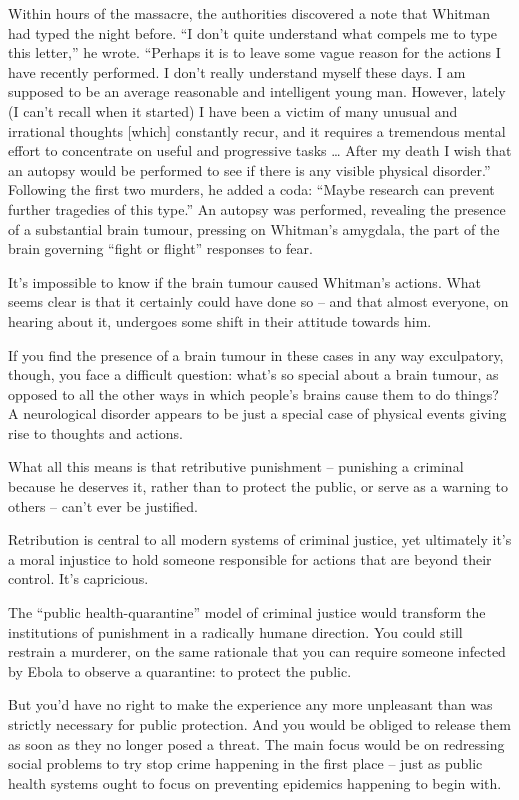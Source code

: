 \documentclass[
]{book}
\begin{document}
Within hours of the massacre, the authorities discovered a note that Whitman had typed the night before. ``I don't quite understand what compels me to type this letter,'' he wrote. ``Perhaps it is to leave some vague reason for the actions I have recently performed. I don't really understand myself these days. I am supposed to be an average reasonable and intelligent young man. However, lately (I can't recall when it started) I have been a victim of many unusual and irrational thoughts {[}which{]} constantly recur, and it requires a tremendous mental effort to concentrate on useful and progressive tasks \ldots{} After my death I wish that an autopsy would be performed to see if there is any visible physical disorder.'' Following the first two murders, he added a coda: ``Maybe research can prevent further tragedies of this type.'' An autopsy was performed, revealing the presence of a substantial brain tumour, pressing on Whitman's amygdala, the part of the brain governing ``fight or flight'' responses to fear.

It's impossible to know if the brain tumour caused Whitman's actions. What seems clear is that it certainly could have done so -- and that almost everyone, on hearing about it, undergoes some shift in their attitude towards him.

If you find the presence of a brain tumour in these cases in any way exculpatory, though, you face a difficult question: what's so special about a brain tumour, as opposed to all the other ways in which people's brains cause them to do things?
A neurological disorder appears to be just a special case of physical events giving rise to thoughts and actions.

What all this means is that retributive punishment -- punishing a criminal because he deserves it, rather than to protect the public, or serve as a warning to others -- can't ever be justified.

Retribution is central to all modern systems of criminal justice, yet ultimately it's a moral injustice to hold someone responsible for actions that are beyond their control. It's capricious.

The ``public health-quarantine'' model of criminal justice would transform the institutions of punishment in a radically humane direction.
You could still restrain a murderer, on the same rationale that you can require someone infected by Ebola to observe a quarantine: to protect the public.

But you'd have no right to make the experience any more unpleasant than was strictly necessary for public protection. And you would be obliged to release them as soon as they no longer posed a threat. The main focus would be on redressing social problems to try stop crime happening in the first place -- just as public health systems ought to focus on preventing epidemics happening to begin with.
\end{document}

